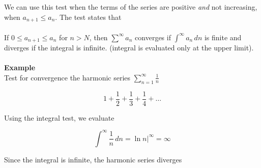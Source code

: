 \documentclass[svgnames]{article}   	%
\begin{document}
\begin{tcolorbox}[colback = blue!5!white, colframe = blue!50!black, title = The
  Integral Test]
  
  We can use this test when the terms of the series are positive \textit{and}
  not increasing, when $a_{n+1} \leq a_n$. The test states that \\\\

  If $0 \leq a_{n+1} \leq a_n$ for $n > N$, then $\sum^\infty a_n$ converges if
  $\int^\infty a_n \, dn$ is finite and diverges if the integral is infinite.
  (integral is evaluated only at the upper limit). \\\\

  \textbf{Example} \\

  Test for convergence the harmonic series $ \sum_{n=1}^{\infty} \frac{1}{n}$ 

  \[
  1 + \frac{1}{2} + \frac{1}{3} + \frac{1}{4} + \dots
  \]
  
  Using the integral test, we evaluate 

  \[
  \int^\infty \frac{1}{n} \, dn = \ln n \big|^\infty = \infty
  \]
  
  Since the integral is infinite, the harmonic series diverges


\end{tcolorbox}
\end{document}
